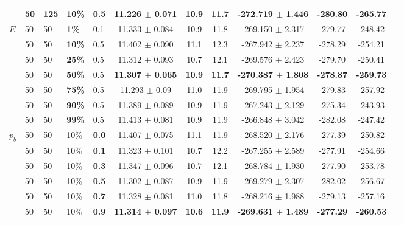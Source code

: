 \begin{sidewaystable}
\begin{tabular}{|l|l|l|l|l||c|c|c|c|c|c|c|}
    ~   & 50 &\textbf{125} & 10\% & 0.5 & 11.226 $\pm$ 0.071 & 10.9 & 11.7 & -272.719 $\pm$ 1.446 & -280.80 & -265.77  \\
    \hline
    $E$ & 50 & 50 & \textbf{1\%} & 0.1 & 11.333 $\pm$ 0.084 & 10.9 & 11.8 & -269.150 $\pm$ 2.317 & -279.77 & -248.42 \\
    ~ & 50 & 50 & \textbf{10\%} & 0.5 & 11.402 $\pm$ 0.090 & 11.1 & 12.3 & -267.942 $\pm$ 2.237 & -278.29 & -254.21 \\
    ~ & 50 & 50 & \textbf{25\%} & 0.5  & 11.312 $\pm$ 0.093 & 10.7 & 12.1 & -269.576 $\pm$ 2.423 & -279.70 & -250.41 \\
    ~ & 50 & 50 & \textbf{50\%} & 0.5 & \textbf{11.307 $\pm$ 0.065} & \textbf{10.9} & \textbf{11.7} & \textbf{-270.387 $\pm$ 1.808}  & \textbf{-278.87} & \textbf{-259.73} \\
    ~ & 50 & 50 & \textbf{75\%} & 0.5  & 11.293 $\pm$ 0.09 & 11.0 & 11.9 & -269.795 $\pm$ 1.954 & -279.83 & -257.92 \\
    ~ & 50 & 50 & \textbf{90\%} & 0.5  & 11.389 $\pm$ 0.089 & 10.9 & 11.9 & -267.243 $\pm$ 2.129 & -275.34 & -243.93 \\
    ~ & 50 & 50 & \textbf{99\%} & 0.5  & 11.413 $\pm$ 0.081 & 10.9 & 11.9 & -266.848 $\pm$ 3.042 & -282.08 & -247.42  \\
    \hline
    $p_{b}$ & 50 & 50 & 10\% & \textbf{0.0} & 11.407 $\pm$ 0.075 & 11.1 & 11.9 & -268.520 $\pm$ 2.176 & -277.39 & -250.82 \\
    ~ & 50 & 50 & 10\% & \textbf{0.1} & 11.323 $\pm$ 0.101 & 10.7 & 12.2 & -267.255 $\pm$ 2.589 & -277.91 & -254.66 \\
    ~ & 50 & 50 & 10\% & \textbf{0.3}& 11.347 $\pm$ 0.096 & 10.7 & 12.1 & -268.784 $\pm$ 1.930 & -277.90 & -253.78 \\
    ~ & 50 & 50 & 10\% & \textbf{0.5}& 11.302 $\pm$ 0.087 & 10.9 & 11.9 & -269.279 $\pm$ 2.307 & -282.02 & -256.67\\
    ~ & 50 & 50 & 10\% & \textbf{0.7}& 11.328 $\pm$ 0.081 & 11.0 & 11.8 & -268.216 $\pm$ 1.988 & -279.13 & -257.16\\
    ~ & 50 & 50 & 10\% & \textbf{0.9} & \textbf{11.314 $\pm$ 0.097} & \textbf{10.6} & \textbf{11.9} & \textbf{-269.631 $\pm$ 1.489} & \textbf{-277.29} & \textbf{-260.53}\\
    

\end{tabular}
\end{sidewaystable}
